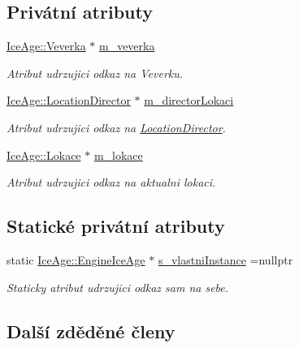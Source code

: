 \subsection*{Privátní atributy}
\begin{DoxyCompactItemize}
\item 
\hyperlink{classIceAge_1_1Veverka}{Ice\+Age\+::\+Veverka} $\ast$ \hyperlink{classIceAge_1_1EngineIceAge_ad9440d38fc579c99a87e7fda88b3bdcd}{m\+\_\+veverka}
\begin{DoxyCompactList}\small\item\em Atribut udrzujici odkaz na Veverku. \end{DoxyCompactList}\item 
\hyperlink{classIceAge_1_1LocationDirector}{Ice\+Age\+::\+Location\+Director} $\ast$ \hyperlink{classIceAge_1_1EngineIceAge_a7e1281f7e78cfda1d10006323a9b0434}{m\+\_\+director\+Lokaci}
\begin{DoxyCompactList}\small\item\em Atribut udrzujici odkaz na \hyperlink{classIceAge_1_1LocationDirector}{Location\+Director}. \end{DoxyCompactList}\item 
\hyperlink{classIceAge_1_1Lokace}{Ice\+Age\+::\+Lokace} $\ast$ \hyperlink{classIceAge_1_1EngineIceAge_a04557f4c59d36d80e16b753cb918ea95}{m\+\_\+lokace}
\begin{DoxyCompactList}\small\item\em Atribut udrzujici odkaz na aktualni lokaci. \end{DoxyCompactList}\end{DoxyCompactItemize}
\subsection*{Statické privátní atributy}
\begin{DoxyCompactItemize}
\item 
static \hyperlink{classIceAge_1_1EngineIceAge}{Ice\+Age\+::\+Engine\+Ice\+Age} $\ast$ \hyperlink{classIceAge_1_1EngineIceAge_a3a28dd4c3cde5578060cf2463a9802c2}{s\+\_\+vlastni\+Instance} =nullptr
\begin{DoxyCompactList}\small\item\em Staticky atribut udrzujici odkaz sam na sebe. \end{DoxyCompactList}\end{DoxyCompactItemize}
\subsection*{Další zděděné členy}


